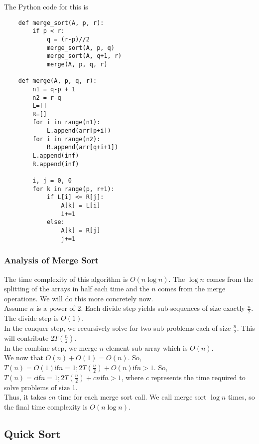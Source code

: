 \documentclass[]{article}
\begin{document}
The Python code for this is 
\begin{lstlisting}
	def merge_sort(A, p, r):
		if p < r:
			q = (r-p)//2
			merge_sort(A, p, q)
			merge_sort(A, q+1, r)
			merge(A, p, q, r)
			
	def merge(A, p, q, r):
		n1 = q-p + 1
		n2 = r-q
		L=[]
		R=[]
		for i in range(n1):
			L.append(arr[p+i])
		for i in range(n2):
			R.append(arr[q+i+1])
		L.append(inf)
		R.append(inf)
		
		i, j = 0, 0
		for k in range(p, r+1):
			if L[i] <= R[j]:
				A[k] = L[i]
				i+=1
			else:
				A[k] = R[j]
				j+=1
\end{lstlisting}\bigbreak

\subsubsection{Analysis of Merge Sort}\bigbreak

The time complexity of this algorithm is $O(n\log n)$. The $\log n$ comes from the splitting of the arrays in half each time and the $n$ comes from the merge operations. We will do this more concretely now.\\

Assume $n$ is a power of 2. Each divide step yields sub-sequences of size exactly $\frac{n}{2}$. The divide step is $O(1)$. \\

In the conquer step, we recursively solve for two sub problems each of size $\frac{n}{2}$. This will contribute $2T(\frac{n}{2})$.\\

In the combine step, we merge $n$-element sub-array which is $O(n)$.\\

We now that $O(n) + O(1) = O(n)$. So, $T(n) = O(1) \text{if} n=1; 2T(\frac{n}{2}) + O(n) \text{if} n > 1$. So, $T(n) = c \text{if} n=1; 2T(\frac{n}{2}) + cn \text{if} n > 1$, where $c$ represents the time required to solve problems of size 1. \\

Thus, it takes $cn$ time for each merge sort call. We call merge sort $\log n$ times, so the final time complexity is $O(n \log n)$.\\


\subsection{Quick Sort}\bigbreak
\end{document}
